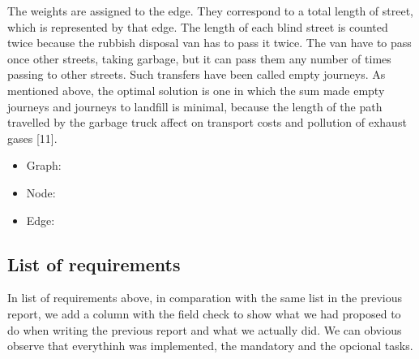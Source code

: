 \documentclass[a4paper]{article}
\begin{document}
The weights are assigned to the edge. They correspond to a total length of street, which is
represented by that edge. The length of each blind street is counted twice because the rubbish disposal
van has to pass it twice. The van have to pass once other streets, taking garbage, but it can pass them
any number of times passing to other streets. Such transfers have been called empty journeys. As
mentioned above, the optimal solution is one in which the sum made empty journeys and journeys to
landfill is minimal, because the length of the path travelled by the garbage truck affect on transport
costs and pollution of exhaust gases [11].

\begin{itemize}
\item Graph:

\item Node:

\item Edge:

 
\end{itemize}


\subsection{List of requirements}\label{subsecsec:requirements}

In list of requirements above, in comparation with the same list in the previous report, we add a column with the field check to show what we had proposed to do when writing the previous report and what we actually did.
We can obvious observe that everythinh was implemented, the mandatory and the opcional tasks.
\end{document}

